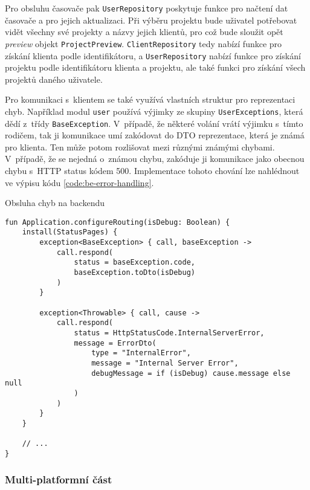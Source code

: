 Pro obsluhu časovače pak \texttt{UserRepository} poskytuje funkce pro načtení dat časovače a pro jejich aktualizaci. Při výběru projektu bude uživatel potřebovat vidět všechny své projekty a názvy jejich klientů, pro což bude sloužit opět \emph{preview} objekt \texttt{ProjectPreview}. \texttt{ClientRepository} tedy nabízí funkce pro získání klienta podle identifikátoru, a \texttt{UserRepository} nabízí funkce pro získání projektu podle identifikátoru klienta a projektu, ale také funkci pro získání všech projektů daného uživatele.

Pro komunikaci s~klientem se také využívá vlastních struktur pro reprezentaci chyb. Například modul \texttt{user} používá výjimky ze skupiny \texttt{UserExceptions}, která dědí z~třídy \texttt{BaseException}. V~případě, že některé volání vrátí výjimku s~tímto rodičem, tak ji komunikace umí zakódovat do DTO reprezentace, která je známá pro klienta. Ten může potom rozlišovat mezi různými známými chybami. V~případě, že se nejedná o~známou chybu, zakóduje ji komunikace jako obecnou chybu s~HTTP status kódem 500. Implementace tohoto chování lze nahlédnout ve výpisu kódu \ref{code:be-error-handling}.

\begin{listing}
\caption{Obsluha chyb na backendu}\label{code:be-error-handling}
\begin{verbatim}
fun Application.configureRouting(isDebug: Boolean) {
    install(StatusPages) {
        exception<BaseException> { call, baseException ->
            call.respond(
                status = baseException.code,
                baseException.toDto(isDebug)
            )
        }

        exception<Throwable> { call, cause ->
            call.respond(
                status = HttpStatusCode.InternalServerError,
                message = ErrorDto(
                    type = "InternalError",
                    message = "Internal Server Error",
                    debugMessage = if (isDebug) cause.message else null
                )
            )
        }
    }
    
    // ...
}
\end{verbatim}
\end{listing}

\subsubsection{Multi-platformní část}

